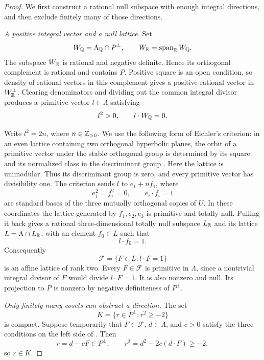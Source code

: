 \begin{proof}
We first construct a rational null subspace with enough integral
directions, and then exclude finitely many of those directions.

\smallskip
\noindent\emph{A positive integral vector and a null lattice.}
Set
\[
  W_{\mathbb Q}=\Lambda_{\mathbb Q}\cap P^\perp,\qquad
  W_{\mathbb R}=\operatorname{span}_{\mathbb R}W_{\mathbb Q}.
\]
The subspace \(W_{\mathbb R}\) is rational and negative definite.  Hence its
orthogonal complement is rational and contains \(P\).  Positive square
is an open condition, so density of rational vectors in this complement
gives a positive rational vector in \(W_{\mathbb R}^\perp\).  Clearing
denominators and dividing out the common integral divisor produces a
primitive vector \(l\in\Lambda\) satisfying
\begin{equation}
\label{eq:lattice-positive-vector}
  l^2>0,\qquad l\cdot W_{\mathbb Q}=0.
\end{equation}

Write \(l^2=2n\), where \(n\in\mathbb Z_{>0}\).  We use the following form of
Eichler's criterion: in an even lattice containing two orthogonal
hyperbolic planes, the orbit of a primitive vector under the stable
orthogonal group is determined by its square and its normalized class
in the discriminant group
\cite[Proposition~3.3(i)]{GritsenkoHulekSankaran2009}.
Here the lattice is unimodular.  Thus its discriminant group is zero,
and every primitive vector has divisibility one.  The criterion sends
\(l\) to \(e_1+n f_1\), where
\[
  e_i^2=f_i^2=0,\qquad e_i\cdot f_i=1
\]
are standard bases of the three mutually orthogonal copies of \(U\).
In these coordinates the lattice generated by \(f_1,e_2,e_3\) is
primitive and totally null.  Pulling it back gives a rational
three-dimensional totally null subspace \(L_{\mathbb R}\) and its lattice
\(L=\Lambda\cap L_{\mathbb R}\), with an element \(f_0\in L\) such that
\begin{equation}
\label{eq:lattice-affine-slice}
  l\cdot f_0=1.
\end{equation}
Consequently
\[
  \mathcal F=\{F\in L:l\cdot F=1\}
\]
is an affine lattice of rank two.  Every \(F\in\mathcal F\) is primitive
in \(\Lambda\), since a nontrivial integral divisor of \(F\) would
divide \(l\cdot F=1\).  It is also nonzero and null.  Its projection to
\(P\) is nonzero by negative definiteness of \(P^\perp\).

\smallskip
\noindent\emph{Only finitely many cosets can obstruct a direction.}
The set
\[
  K=\{r\in P^\perp:r^2\geq-2\}
\]
is compact.  Suppose temporarily that \(F\in\mathcal F\), \(d\in\Lambda\),
and \(c>0\) satisfy the three conditions on the left side of
.  Then
\begin{equation}
\label{eq:lattice-bounded-residual}
  r=d-cF\in P^\perp,\qquad
  r^2=d^2-2c(d\cdot F)\geq-2,
\end{equation}
so \(r\in K\).


\end{proof}
